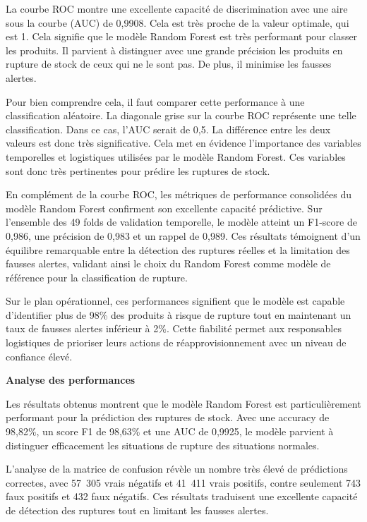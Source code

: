 La courbe ROC montre une excellente capacité de discrimination avec une aire sous la courbe (AUC) de 0,9908. Cela est très proche de la valeur optimale, qui est 1. Cela signifie que le modèle Random Forest est très performant pour classer les produits. Il parvient à distinguer avec une grande précision les produits en rupture de stock de ceux qui ne le sont pas. De plus, il minimise les fausses alertes.
 
Pour bien comprendre cela, il faut comparer cette performance à une classification aléatoire. La diagonale grise sur la courbe ROC représente une telle classification. Dans ce cas, l'AUC serait de 0,5. La différence entre les deux valeurs est donc très significative. Cela met en évidence l'importance des variables temporelles et logistiques utilisées par le modèle Random Forest. Ces variables sont donc très pertinentes pour prédire les ruptures de stock.
 
En complément de la courbe ROC, les métriques de performance consolidées du modèle Random Forest confirment son excellente capacité prédictive. Sur l'ensemble des 49 folds de validation temporelle, le modèle atteint un F1-score de 0,986, une précision de 0,983 et un rappel de 0,989. Ces résultats témoignent d'un équilibre remarquable entre la détection des ruptures réelles et la limitation des fausses alertes, validant ainsi le choix du Random Forest comme modèle de référence pour la classification de rupture.
 
Sur le plan opérationnel, ces performances signifient que le modèle est capable d'identifier plus de 98\% des produits à risque de rupture tout en maintenant un taux de fausses alertes inférieur à 2\%. Cette fiabilité permet aux responsables logistiques de prioriser leurs actions de réapprovisionnement avec un niveau de confiance élevé.
 
\textbf{Analyse des performances} 
 
Les résultats obtenus montrent que le modèle Random Forest est particulièrement performant pour la prédiction des ruptures de stock. Avec une accuracy de 98,82\%, un score F1 de 98,63\% et une AUC de 0,9925, le modèle parvient à distinguer efficacement les situations de rupture des situations normales.
 
L'analyse de la matrice de confusion révèle un nombre très élevé de prédictions correctes, avec 57~305 vrais négatifs et 41~411 vrais positifs, contre seulement 743 faux positifs et 432 faux négatifs. Ces résultats traduisent une excellente capacité de détection des ruptures tout en limitant les fausses alertes.
 
